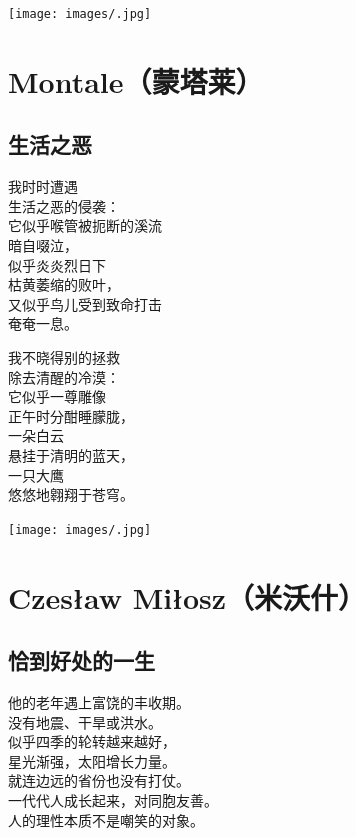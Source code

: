 \documentclass[
]{book}
\renewenvironment{quote}{\begin{VF}}{\end{VF}}
\begin{document}
\texttt{[image: images/.jpg]}

\hypertarget{montale}{%
\chapter{Montale（蒙塔莱）}\label{montale}}

\hypertarget{section-61}{%
\section{生活之恶}\label{section-61}}

\begin{quote}
我时时遭遇\\
生活之恶的侵袭：\\
它似乎喉管被扼断的溪流\\
暗自啜泣，\\
似乎炎炎烈日下\\
枯黄萎缩的败叶，\\
又似乎鸟儿受到致命打击\\
奄奄一息。

我不晓得别的拯救\\
除去清醒的冷漠：\\
它似乎一尊雕像\\
正午时分酣睡朦胧，\\
一朵白云\\
悬挂于清明的蓝天，\\
一只大鹰\\
悠悠地翱翔于苍穹。
\end{quote}

\texttt{[image: images/.jpg]}

\hypertarget{czesaw-miosz}{%
\chapter{Czesław Miłosz（米沃什）}\label{czesaw-miosz}}

\hypertarget{section-62}{%
\section{恰到好处的一生}\label{section-62}}

\begin{quote}
他的老年遇上富饶的丰收期。\\
没有地震、干旱或洪水。\\
似乎四季的轮转越来越好，\\
星光渐强，太阳增长力量。\\
就连边远的省份也没有打仗。\\
一代代人成长起来，对同胞友善。\\
人的理性本质不是嘲笑的对象。
\end{quote}
\end{document}
